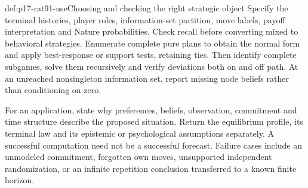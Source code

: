 \begin{hbmethod}{def:p17-rat91-use}{Choosing and checking the right strategic object}
Specify the terminal histories, player roles, information-set partition,
move labels, payoff interpretation and Nature probabilities. Check
recall before converting mixed to behavioral strategies. Enumerate
complete pure plans to obtain the normal form and apply best-response
or support tests, retaining ties. Then identify complete subgames,
solve them recursively and verify deviations both on and off path.
At an unreached nonsingleton information set, report missing node
beliefs rather than conditioning on zero.

For an application, state why preferences, beliefs, observation,
commitment and time structure describe the proposed situation. Return
the equilibrium profile, its terminal law and its epistemic or
psychological assumptions separately. A successful computation need
not be a successful forecast. Failure cases include an unmodeled
commitment, forgotten own moves, unsupported independent randomization,
or an infinite repetition conclusion transferred to a known finite horizon.
\end{hbmethod}

